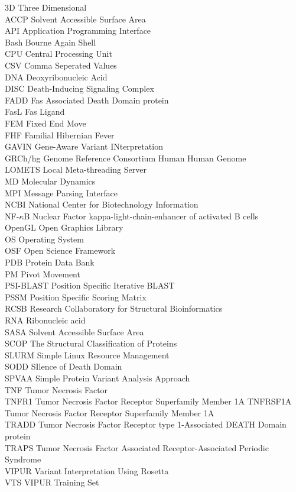 3D Three Dimensional\\
ACCP Solvent Accessible Surface Area\\
API Application Programming Interface\\
Bash Bourne Again Shell\\
CPU Central Processing Unit\\
CSV Comma Seperated Values\\
DNA Deoxyribonucleic Acid\\
DISC Death-Inducing Signaling Complex\\
FADD Fas Associated Death Domain protein\\
FasL Fas Ligand\\
FEM Fixed End Move\\
FHF Familial Hibernian Fever\\
GAVIN Gene-Aware Variant INterpretation\\
GRCh/hg Genome Reference Consortium Human Human Genome\\
LOMETS Local Meta-threading Server\\
MD	Molecular Dynamics\\
MPI Message Parsing Interface\\
NCBI National Center for Biotechnology Information\\
NF-$\kappa$B Nuclear Factor kappa-light-chain-enhancer of activated B cells\\
OpenGL Open Graphics Library\\
OS Operating System\\
OSF Open Science Framework\\
PDB Protein Data Bank\\
PM Pivot Movement\\
PSI-BLAST Position Specific Iterative BLAST\\
PSSM Position Specific Scoring Matrix\\
RCSB Research Collaboratory for Structural Bioinformatics\\
RNA Ribonucleic acid\\
SASA Solvent Accessible Surface Area\\
SCOP The Structural Classification of Proteins\\
SLURM Simple Linux Resource Management\\
SODD SIlence of Death Domain\\
SPVAA Simple Protein Variant Analysis Approach\\
TNF Tumor Necrosis Factor\\
TNFR1 Tumor Necrosis Factor Receptor Superfamily Member 1A
TNFRSF1A Tumor Necrosis Factor Receptor Superfamily Member 1A\\
TRADD Tumor Necrosis Factor Receptor type 1-Associated DEATH Domain protein\\
TRAPS Tumor Necrosis Factor Associated Receptor-Associated Periodic Syndrome\\
VIPUR Variant Interpretation Using Rosetta\\
VTS VIPUR Training Set\\